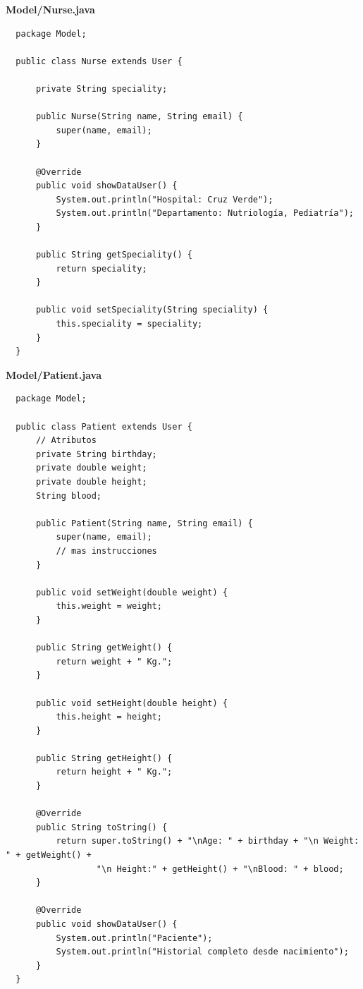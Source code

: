 \documentclass{article}
\begin{document}
\textbf{Model/Nurse.java}
\begin{verbatim}
  package Model;

  public class Nurse extends User {

      private String speciality;

      public Nurse(String name, String email) {
          super(name, email);
      }

      @Override
      public void showDataUser() {
          System.out.println("Hospital: Cruz Verde");
          System.out.println("Departamento: Nutriología, Pediatría");
      }

      public String getSpeciality() {
          return speciality;
      }

      public void setSpeciality(String speciality) {
          this.speciality = speciality;
      }
  }
\end{verbatim}

\textbf{Model/Patient.java}
\begin{verbatim}
  package Model;

  public class Patient extends User {
      // Atributos
      private String birthday;
      private double weight;
      private double height;
      String blood;

      public Patient(String name, String email) {
          super(name, email);
          // mas instrucciones
      }

      public void setWeight(double weight) {
          this.weight = weight;
      }

      public String getWeight() {
          return weight + " Kg.";
      }

      public void setHeight(double height) {
          this.height = height;
      }

      public String getHeight() {
          return height + " Kg.";
      }

      @Override
      public String toString() {
          return super.toString() + "\nAge: " + birthday + "\n Weight: " + getWeight() +
                  "\n Height:" + getHeight() + "\nBlood: " + blood;
      }

      @Override
      public void showDataUser() {
          System.out.println("Paciente");
          System.out.println("Historial completo desde nacimiento");
      }
  }
\end{verbatim}
\end{document}
